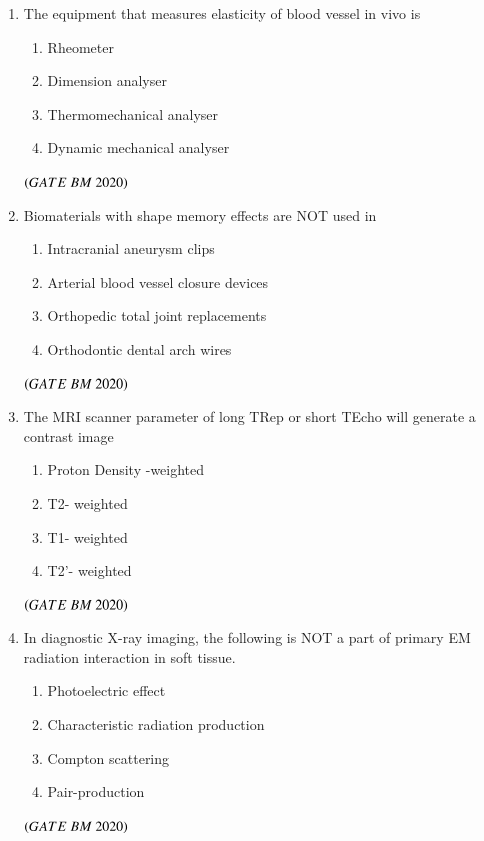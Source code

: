 \documentclass[journal,12pt,onecolumn]{IEEEtran}
\theoremstyle{remark}
\begin{document}
\begin{enumerate}
\item The equipment that measures elasticity of blood vessel in vivo is
\begin{enumerate}[label=\alph*)]
\item\hspace{0.5cm}Rheometer
\item\hspace{0.5cm}Dimension analyser
\item\hspace{0.5cm}Thermomechanical analyser
\item\hspace{0.5cm}Dynamic mechanical analyser
\end{enumerate}
 \hfill $\left(GATE\ BM\ 2020\right)$
 
\item Biomaterials with shape memory effects are NOT used in
\begin{enumerate}[label=\alph*)] 
\item\hspace{0.5cm}Intracranial aneurysm clips
\item\hspace{0.5cm}Arterial blood vessel closure devices
\item\hspace{0.5cm}Orthopedic total joint replacements
\item\hspace{0.5cm}Orthodontic dental arch wires
\end{enumerate}
 \hfill $\left(GATE\ BM\ 2020\right)$
 
\item The MRI scanner parameter of long TRep or short TEcho will generate a\underline{\hspace{2cm}} contrast image
\begin{enumerate}[label=\alph*)] 
\item\hspace{0.5cm}Proton Density -weighted
\item\hspace{0.5cm}T2- weighted
\item\hspace{0.5cm}T1- weighted
\item\hspace{0.5cm}T2'- weighted
\end{enumerate}
 \hfill $\left(GATE\ BM\ 2020\right)$

\item In diagnostic X-ray imaging, the following is NOT a part of primary EM radiation interaction in soft tissue.
\begin{enumerate}[label=\alph*)] 
\item\hspace{0.5cm}Photoelectric effect
\item\hspace{0.5cm}Characteristic radiation production
\item\hspace{0.5cm}Compton scattering
\item\hspace{0.5cm}Pair-production
\end{enumerate}
\hfill $\left(GATE\ BM\ 2020\right)$
 

\end{enumerate}
\end{document}
